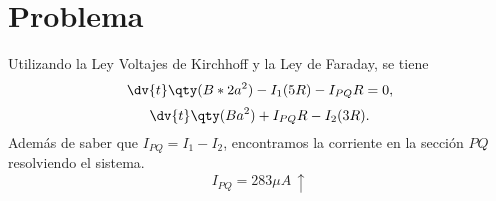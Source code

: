 \section*{Problema}


Utilizando la Ley Voltajes de Kirchhoff y la Ley de Faraday, se tiene
	$$ \dv{t} \qty(B*2a^2) - I_1 (5R) - I_{PQ} R = 0, $$
	$$ \dv{t} \qty(Ba^2) +I_{PQ} R - I_2 (3R). $$
Además de saber que $I_{PQ} = I_1 - I_2$, encontramos la corriente en la sección $PQ$ resolviendo el sistema.
	$$ \boxed{ I_{PQ} = 283\mu A\, \uparrow } $$


